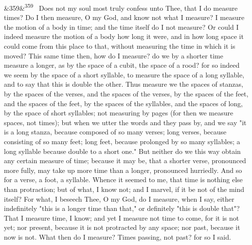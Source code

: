 \documentclass[12pt]{article}
\newcommand{\para}[1][]{\par\noindent\ifx&#1&\else\textsuperscript{\footnotesize #1}~\fi}
\begin{document}
\para[359] Does not my soul most truly confess unto Thee, that I do measure times? Do I then measure, O my God, and know not what I measure? I measure the motion of a body in time; and the time itself do I not measure? Or could I indeed measure the motion of a body how long it were, and in how long space it could come from this place to that, without measuring the time in which it is moved? This same time then, how do I measure? do we by a shorter time measure a longer, as by the space of a cubit, the space of a rood? for so indeed we seem by the space of a short syllable, to measure the space of a long syllable, and to say that this is double the other. Thus measure we the spaces of stanzas, by the spaces of the verses, and the spaces of the verses, by the spaces of the feet, and the spaces of the feet, by the spaces of the syllables, and the spaces of long, by the space of short syllables; not measuring by pages (for then we measure spaces, not times); but when we utter the words and they pass by, and we say "it is a long stanza, because composed of so many verses; long verses, because consisting of so many feet; long feet, because prolonged by so many syllables; a long syllable because double to a short one." But neither do we this way obtain any certain measure of time; because it may be, that a shorter verse, pronounced more fully, may take up more time than a longer, pronounced hurriedly. And so for a verse, a foot, a syllable. Whence it seemed to me, that time is nothing else than protraction; but of what, I know not; and I marvel, if it be not of the mind itself? For what, I beseech Thee, O my God, do I measure, when I say, either indefinitely "this is a longer time than that," or definitely "this is double that"? That I measure time, I know; and yet I measure not time to come, for it is not yet; nor present, because it is not protracted by any space; nor past, because it now is not. What then do I measure? Times passing, not past? for so I said.
\end{document}
